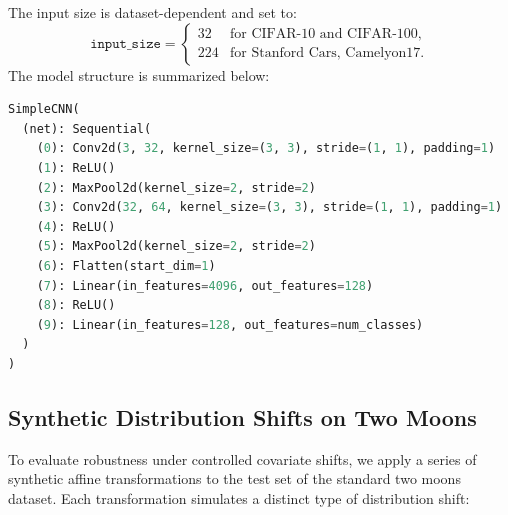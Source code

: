 \vspace{0.5em}
\noindent
The input size is dataset-dependent and set to:
\[
\texttt{input\_size} = 
\begin{cases}
32 & \text{for CIFAR-10 and CIFAR-100}, \\
224 & \text{for Stanford Cars, Camelyon17}. %
\end{cases}
\]
The model structure is summarized below:
\begin{lstlisting}[language=Python]
SimpleCNN(
  (net): Sequential(
    (0): Conv2d(3, 32, kernel_size=(3, 3), stride=(1, 1), padding=1)
    (1): ReLU()
    (2): MaxPool2d(kernel_size=2, stride=2)
    (3): Conv2d(32, 64, kernel_size=(3, 3), stride=(1, 1), padding=1)
    (4): ReLU()
    (5): MaxPool2d(kernel_size=2, stride=2)
    (6): Flatten(start_dim=1)
    (7): Linear(in_features=4096, out_features=128)
    (8): ReLU()
    (9): Linear(in_features=128, out_features=num_classes)
  )
)
\end{lstlisting}


\subsection{Synthetic Distribution Shifts on Two Moons}
\label{app:twomoons-shifts}

To evaluate robustness under controlled covariate shifts, we apply a series of synthetic affine transformations to the test set of the standard two moons dataset. Each transformation simulates a distinct type of distribution shift:

